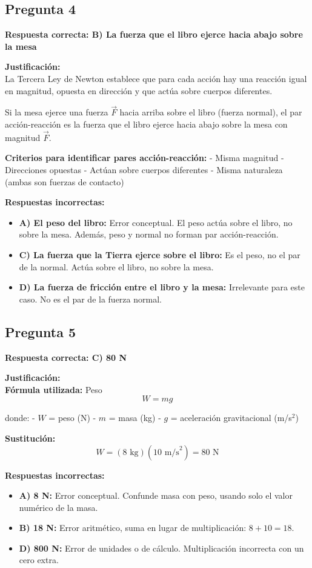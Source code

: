 \begin{respuestabox}
\subsection{Pregunta 4}
\textcolor{verdecorrecto}{\textbf{Respuesta correcta: B) La fuerza que el libro ejerce hacia abajo sobre la mesa}}

\textbf{Justificación:}\\
La Tercera Ley de Newton establece que para cada acción hay una reacción igual en magnitud, opuesta en dirección y que actúa sobre cuerpos diferentes.

Si la mesa ejerce una fuerza $\vec{F}$ hacia arriba sobre el libro (fuerza normal), el par acción-reacción es la fuerza que el libro ejerce hacia abajo sobre la mesa con magnitud $\vec{F}$.

\textbf{Criterios para identificar pares acción-reacción:}
- Misma magnitud
- Direcciones opuestas
- Actúan sobre cuerpos diferentes
- Misma naturaleza (ambas son fuerzas de contacto)

\textbf{Respuestas incorrectas:}
\begin{itemize}
    \item \textbf{A) El peso del libro:} Error conceptual. El peso actúa sobre el libro, no sobre la mesa. Además, peso y normal no forman par acción-reacción.
    \item \textbf{C) La fuerza que la Tierra ejerce sobre el libro:} Es el peso, no el par de la normal. Actúa sobre el libro, no sobre la mesa.
    \item \textbf{D) La fuerza de fricción entre el libro y la mesa:} Irrelevante para este caso. No es el par de la fuerza normal.
\end{itemize}
\end{respuestabox}
\newpage
\begin{respuestabox}

\subsection{Pregunta 5}
\textcolor{verdecorrecto}{\textbf{Respuesta correcta: C) 80 N}}

\textbf{Justificación:}\\
\textbf{Fórmula utilizada:} Peso
$$W = mg$$

donde:
- $W$ = peso (N)
- $m$ = masa (kg)
- $g$ = aceleración gravitacional (m/s$^2$)

\textbf{Sustitución:}
$$W = (8 \text{ kg})(10 \text{ m/s}^2) = 80 \text{ N}$$

\textbf{Respuestas incorrectas:}
\begin{itemize}
    \item \textbf{A) 8 N:} Error conceptual. Confunde masa con peso, usando solo el valor numérico de la masa.
    \item \textbf{B) 18 N:} Error aritmético, suma en lugar de multiplicación: $8 + 10 = 18$.
    \item \textbf{D) 800 N:} Error de unidades o de cálculo. Multiplicación incorrecta con un cero extra.
\end{itemize}
\end{respuestabox}

